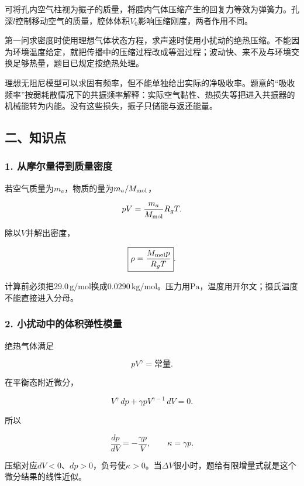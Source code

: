 \documentclass[12pt,a4paper,fontset=fandol]{ctexart}
\begin{document}
可将孔内空气柱视为振子的质量，将腔内气体压缩产生的回复力等效为弹簧力。孔深\(l\)控制移动空气的质量，腔体体积\(V_0\)影响压缩刚度，两者作用不同。

第一问求密度时使用理想气体状态方程，求声速时使用小扰动的绝热压缩。不能因为环境温度给定，就把传播中的压缩过程改成等温过程；波动快、来不及与环境交换足够热量，题目已规定按绝热处理。

理想无阻尼模型可以求固有频率，但不能单独给出实际的净吸收率。题意的``吸收频率''按弱耗散情况下的共振频率解释：实际空气黏性、热损失等把进入共振器的机械能转为内能。没有这些损失，振子只储能与返还能量。

\subsection{二、知识点}\label{ux4e8cux77e5ux8bc6ux70b9-3}

\subsubsection{1.
从摩尔量得到质量密度}\label{ux4eceux6469ux5c14ux91cfux5f97ux5230ux8d28ux91cfux5bc6ux5ea6}

若空气质量为\(m_a\)，物质的量为\(m_a/M_{\rm mol}\)，

\[
pV=\frac{m_a}{M_{\rm mol}}R_gT.
\]

除以\(V\)并解出密度，

\[
\boxed{\rho=\frac{M_{\rm mol}p}{R_gT}}.
\]

计算前必须把\(29.0\,\mathrm{g/mol}\)换成\(0.0290\,\mathrm{kg/mol}\)。压力用\(\mathrm{Pa}\)，温度用开尔文；摄氏温度不能直接进入分母。

\subsubsection{2.
小扰动中的体积弹性模量}\label{ux5c0fux6270ux52a8ux4e2dux7684ux4f53ux79efux5f39ux6027ux6a21ux91cf}

绝热气体满足

\[
pV^\gamma=\text{常量}.
\]

在平衡态附近微分，

\[
V^\gamma\,dp+\gamma pV^{\gamma-1}\,dV=0.
\]

所以

\[
\frac{dp}{dV}=-\frac{\gamma p}{V},
\qquad
\boxed{\kappa=\gamma p}.
\]

压缩对应\(dV<0\)、\(dp>0\)，负号使\(\kappa>0\)。当\(\Delta V\)很小时，题给有限增量式就是这个微分结果的线性近似。
\end{document}
